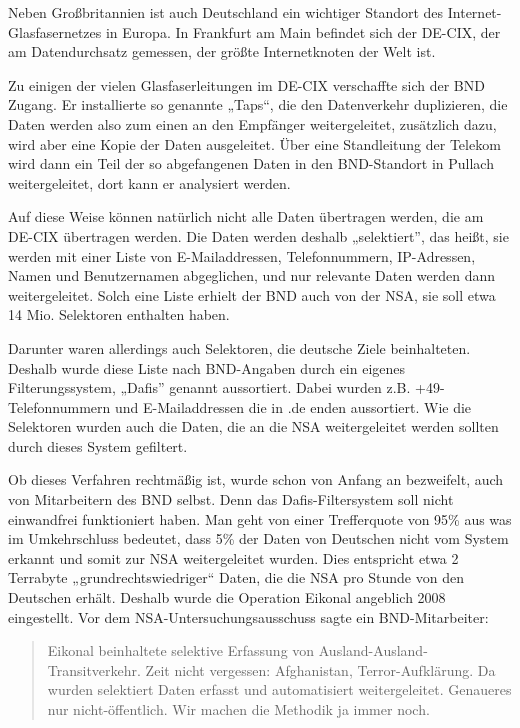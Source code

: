\documentclass[12pt,a4paper]{scrartcl}
\begin{document}
Neben Großbritannien ist auch Deutschland ein wichtiger Standort des Internet-Glasfasernetzes in Europa. In Frankfurt am Main befindet sich der DE-CIX, der am Datendurchsatz gemessen, der größte Internetknoten der Welt ist.\cite{decix_facts}

Zu einigen der vielen Glasfaserleitungen im DE-CIX verschaffte sich der BND Zugang. Er installierte so genannte „Taps“, die den Datenverkehr duplizieren, die Daten werden also zum einen an den Empfänger weitergeleitet, zusätzlich dazu, wird aber eine Kopie der Daten ausgeleitet.\cite{wiki_eikonal} Über eine Standleitung der Telekom wird dann ein Teil der so abgefangenen Daten in den BND-Standort in Pullach weitergeleitet, dort kann er analysiert werden.\cite{zeit_eikonal}

Auf diese Weise können natürlich nicht alle Daten übertragen werden, die am DE-CIX übertragen werden. Die Daten werden deshalb „selektiert”, das heißt, sie werden mit einer Liste von E-Mailaddressen, Telefonnummern, IP-Adressen, Namen und Benutzernamen abgeglichen, und nur relevante Daten werden dann weitergeleitet. Solch eine Liste erhielt der BND auch von der NSA, sie soll etwa 14 Mio. Selektoren enthalten haben.\cite{ard_selektoren}

Darunter waren allerdings auch Selektoren, die deutsche Ziele beinhalteten. Deshalb wurde diese Liste nach BND-Angaben durch ein eigenes Filterungssystem, „Dafis” genannt aussortiert. Dabei wurden z.B. +49-Telefonnummern und E-Mailaddressen die in .de enden aussortiert. Wie die Selektoren wurden auch die Daten, die an die NSA weitergeleitet werden sollten durch dieses System gefiltert.\cite{bundestag_selektoren}

Ob dieses Verfahren rechtmäßig ist, wurde schon von Anfang an bezweifelt, auch von Mitarbeitern des BND selbst. Denn das Dafis-Filtersystem soll nicht einwandfrei funktioniert haben. Man geht von einer Trefferquote von 95\% aus was im Umkehrschluss bedeutet, dass 5\% der Daten von Deutschen nicht vom System erkannt und somit zur NSA weitergeleitet wurden. Dies entspricht etwa 2 Terrabyte „grundrechtswiedriger“ Daten, die die NSA pro Stunde von den Deutschen erhält.\cite{wiki_eikonal} Deshalb wurde die Operation Eikonal angeblich 2008 eingestellt. Vor dem NSA-Untersuchungsausschuss sagte ein BND-Mitarbeiter:

\begin{quote}
Eikonal beinhaltete selektive Erfassung von Ausland-Ausland-Transitverkehr. Zeit nicht vergessen: Afghanistan, Terror-Aufklärung. Da wurden selektiert Daten erfasst und automatisiert weitergeleitet. Genaueres nur nicht-öffentlich. Wir machen die Methodik ja immer noch.\cite{wiki_eikonal}
\end{quote}
\end{document}
